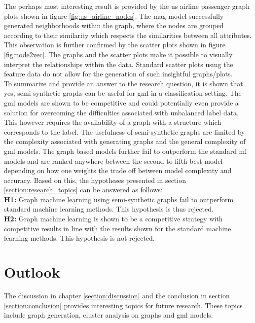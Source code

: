   \noindent The perhaps most interesting result is provided by the \acs{us} 
  airline passenger graph plots shown in figure \ref{fig:us_airline_nodes}. The 
  \acs{mag} model successfully generated neighborhoods within the graph, where 
  the nodes are grouped according to their similarity which respects the 
  similarities between all attributes. This observation is further confirmed 
  by the scatter plots shown in figure \ref{fig:node2vec}. The graphs and the 
  scatter plots make it possible to visually interpret the relationships within 
  the data. Standard scatter plots using the feature data do not allow for the 
  generation of such insightful graphs/plots. \\

  \noindent To summarize and provide an answer to the research question, it is
  shown that yes, semi-synthetic graphs can be useful for \acs{gml} in a
  classification setting. The \acs{gml} models are shown to be competitive and 
  could potentially even provide a solution for overcoming the difficulties 
  associated with unbalanced label data. This however requires the availability 
  of a graph with a structure which corresponds to the label. The usefulness of 
  semi-synthetic graphs are limited by the complexity associated with generating 
  graphs and the general complexity of \acs{gml} models. The graph based models 
  further fail to outperform the standard \acs{ml} models and are ranked 
  anywhere between the second to fifth best model depending on how one weights 
  the trade off between model complexity and accuracy. Based on this, the 
  hypotheses presented in section \ref{section:research_topics} can be answered 
  as follows: \\

  \noindent\textbf{H1:} Graph machine learning using semi-synthetic graphs fail
  to outperform standard machine learning methods. This hypothesis is thus
  rejected. \\

  \noindent\textbf{H2:} Graph machine learning is shown to be a competitive
  strategy with competitive results in line with the results shown for the
  standard machine learning methods. This hypothesis is not rejected.

  \section{Outlook}

  The discussion in chapter \ref{section:discussion} and the conclusion in section
  \ref{section:conclusion} provides interesting topics for future research.
  These topics include graph generation, cluster analysis on graphs and
  \acs{gml} models. 

